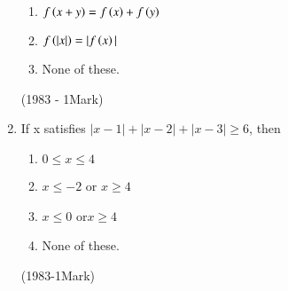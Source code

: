 \documentclass[journal]{IEEEtran}
\begin{document}
\begin{enumerate}
\begin{multicols}{2}
\begin{enumerate}
      \item  $f\left(x+y\right)=f\left(x\right)+f\left(y\right)$

      \item $f\left(|x|\right)=|f\left(x\right)|$

      \item None of these.
      \end{enumerate}
  \end{multicols}
  \hfill
  (1983 - 1Mark)



  \item If x satisfies $|x-1| + |x-2| + |x-3|\geq6$, then
  \begin{multicols}{2}
    \begin{enumerate}
        

      \item $0\leq x\leq4$
      
      \item $x \leq-2$ or $x\geq4$
      
      \item $x\leq0$ or$x\geq4$
      
      \item None of these.

    \end{enumerate}
  \end{multicols}
  \hfill
  (1983-1Mark)



  

\end{enumerate}
\end{document}
